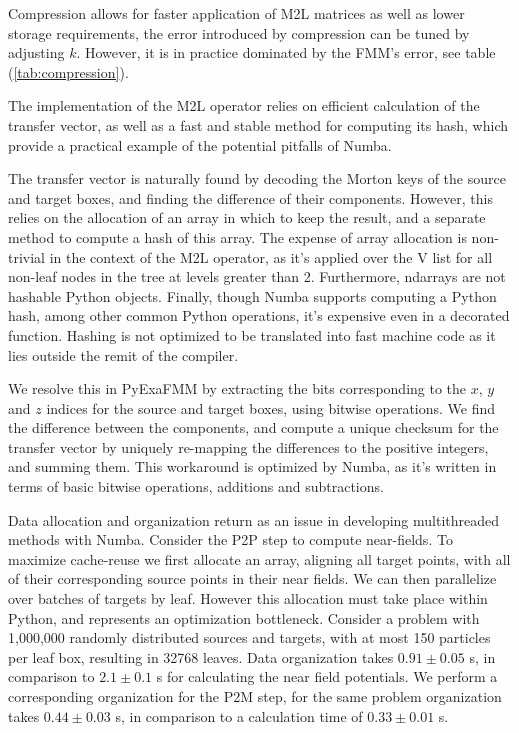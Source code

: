 \documentclass{IEEEcsmag}
\begin{document}
Compression allows for faster application of M2L matrices as well as lower storage requirements, the error introduced by compression can be tuned by adjusting $k$. However, it is in practice dominated by the FMM's error, see table (\ref{tab:compression}).

The implementation of the M2L operator relies on efficient calculation of the transfer vector, as well as a fast and stable method for computing its hash, which provide a practical example of the potential pitfalls of Numba.

The transfer vector is naturally found by decoding the Morton keys of the source and target boxes, and finding the difference of their components. However, this relies on the allocation of an array in which to keep the result, and a separate method to compute a hash of this array. The expense of array allocation is non-trivial in the context of the M2L operator, as it's applied over the V list for all non-leaf nodes in the tree at levels greater than 2. Furthermore, ndarrays are not hashable Python objects. Finally, though Numba supports computing a Python hash, among other common Python operations, it's expensive even in a decorated function. Hashing is not optimized to be translated into fast machine code as it lies outside the remit of the compiler.

We resolve this in PyExaFMM by extracting the bits corresponding to the $x$, $y$ and $z$ indices for the source and target boxes, using bitwise operations. We find the difference between the components, and compute a unique checksum for the transfer vector by uniquely re-mapping the differences to the positive integers, and summing them. This workaround is optimized by Numba, as it's written in terms of basic bitwise operations, additions and subtractions.

Data allocation and organization return as an issue in developing multithreaded methods with Numba. Consider the P2P step to compute near-fields. To maximize cache-reuse we first allocate an array, aligning all target points, with all of their corresponding source points in their near fields. We can then parallelize over batches of targets by leaf. However this allocation must take place within Python, and represents an optimization bottleneck. Consider a problem with 1,000,000 randomly distributed sources and targets, with at most 150 particles per leaf box, resulting in 32768 leaves. Data organization takes $0.91 \pm 0.05$ s, in comparison to $2.1 \pm 0.1$ s for calculating the near field potentials. We perform a corresponding organization for the P2M step, for the same problem organization takes $0.44 \pm 0.03$ s, in comparison to a calculation time of $0.33 \pm 0.01$ s.
\end{document}
